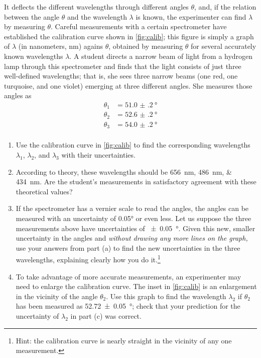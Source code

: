\documentclass[nobib,nofonts,nols,nohyper]{tufte-handout}
\begin{document}
\begin{enumerate}
	It deflects the different wavelengths through different angles \( \theta \), and, if the relation between the angle \( \theta \) and the wavelength \( \lambda \) is known, the experimenter can find \( \lambda \) by measuring \( \theta \). 
	Careful measurements with a certain spectrometer have established the calibration curve shown in \cref{fig:calib}; this figure is simply a graph of \( \lambda \) (in nanometers, \si{\nm}) agains \( \theta \), obtained by measuring \( \theta \) for several accurately known wavelengths \( \lambda \). 
	A student directs a narrow beam of light from a hydrogen lamp through this spectrometer and finds that the light consists of just three well-defined wavelengths; that is, she sees three narrow beams (one red, one turquoise, and one violet) emerging at three different angles. 
	She measures those angles as
	\begin{align*}
		\theta_1 &= \SI{51.0(2)}{\degree} \\
		\theta_2 &= \SI{52.6(2)}{\degree} \\
		\theta_3 &= \SI{54.0(2)}{\degree} \\
	\end{align*}
	\begin{enumerate}
		\item Use the calibration curve in \cref{fig:calib} to find the corresponding wavelengths \( \lambda_1 \), \( \lambda_2 \), and \( \lambda_3 \) with their uncertainties. 
		\item According to theory, these wavelengths should be \SIlist{656;486;434}{\nm}. 
		Are the student's measurements in satisfactory agreement with these theoretical values?
		\item If the spectrometer has a vernier scale to read the angles, the angles can be measured with an uncertainty of \ang{0.05} or even less. 
		Let us suppose the three measurements above have uncertainties of \SI{\pm0.05}{\degree}. Given this new, smaller uncertainty in the angles and \emph{without drawing any more lines on the graph,} use your answers from part (a) to find the new uncertainties in the three wavelengths, explaining clearly how you do it.\footnote{Hint: the calibration curve is nearly straight in the vicinity of any one measurement.}
		\item To take advantage of more accurate measurements, an experimenter may need to enlarge the calibration curve. 
		The inset in \cref{fig:calib} is an enlargement in the vicinity of the angle \( \theta_2 \). 
		Use this graph to find the wavelength \( \lambda_2 \) if \( \theta_2 \) has been measured as \SI{52.72(5)}{\degree}; check that your prediction for the uncertainty of \( \lambda_2 \) in part (c) was correct. 
	\end{enumerate}
\end{enumerate}



\nocite{*}
\printbibliography[category=cited]%

\printbibliography[title={Further Reading},notcategory=cited]
\end{document}
